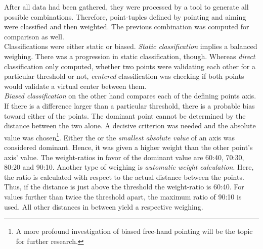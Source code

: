After all data had been gathered, they were processed by a tool to generate all possible combinations. Therefore, point-tuples defined by pointing and aiming were classified and then weighted. The previous combination was computed for comparison as well.
\\
Classifications were either static or biased. \textit{Static classification} implies a balanced weighing. There was a progression in static classification, though. Whereas \textit{direct} classification only computed, whether two points were validating each other for a particular threshold or not, \textit{centered} classification was checking if both points would validate a virtual center between them.
\\
\textit{Biased classification} on the other hand compares each of the defining points axis. If there is a difference larger than a particular threshold, there is a probable bias toward either of the points. The dominant point cannot be determined by the distance between the two alone. A decisive criterion was needed and the absolute value was chosen\footnote{A more profound investigation of biased free-hand pointing will be the topic for further research.}. Either the  or the \textit{smallest absolute value} of an axis was considered dominant. Hence, it was given a higher weight than the other point's axis' value. The weight-ratios in favor of the dominant value are 60:40, 70:30, 80:20 and 90:10. Another type of weighing is \textit{automatic weight calculation}. Here, the ratio is calculated with respect to the actual distance between the points. Thus, if the distance is just above the threshold the weight-ratio is 60:40. For values further than twice the threshold apart, the maximum ratio of 90:10 is used. All other distances in between yield a respective weighing.

